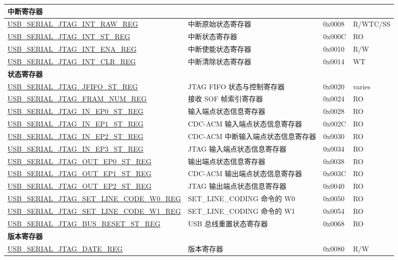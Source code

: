 \begin{longtable}{ | p{7.4cm} | p{5.2cm} | p{1.2cm} | p{1.7cm} | }
\multicolumn{4}{|l|}{\textbf{中断寄存器}} \\ \hline
\hyperref[regdesc:USBSERIALJTAGINTRAWREG]{USB\_SERIAL\_JTAG\_INT\_RAW\_REG} & 中断原始状态寄存器 & 0x0008 & R/WTC/SS \\ \hline
\hyperref[regdesc:USBSERIALJTAGINTSTREG]{USB\_SERIAL\_JTAG\_INT\_ST\_REG} & 中断状态寄存器 & 0x000C & RO \\ \hline
\hyperref[regdesc:USBSERIALJTAGINTENAREG]{USB\_SERIAL\_JTAG\_INT\_ENA\_REG} & 中断使能状态寄存器 & 0x0010 & R/W \\ \hline
\hyperref[regdesc:USBSERIALJTAGINTCLRREG]{USB\_SERIAL\_JTAG\_INT\_CLR\_REG} & 中断清除状态寄存器 & 0x0014 & WT \\ \hline
\multicolumn{4}{|l|}{\textbf{状态寄存器}} \\ \hline
\hyperref[regdesc:USBSERIALJTAGJFIFOSTREG]{USB\_SERIAL\_JTAG\_JFIFO\_ST\_REG} & JTAG FIFO 状态与控制寄存器 & 0x0020 & varies \\ \hline
\hyperref[regdesc:USBSERIALJTAGFRAMNUMREG]{USB\_SERIAL\_JTAG\_FRAM\_NUM\_REG} & 接收 SOF 帧索引寄存器 & 0x0024 & RO \\ \hline
\hyperref[regdesc:USBSERIALJTAGINEP0STREG]{USB\_SERIAL\_JTAG\_IN\_EP0\_ST\_REG} & 输入端点状态信息寄存器 & 0x0028 & RO \\ \hline
\hyperref[regdesc:USBSERIALJTAGINEP1STREG]{USB\_SERIAL\_JTAG\_IN\_EP1\_ST\_REG} & CDC-ACM 输入端点状态信息寄存器 & 0x002C & RO \\ \hline
\hyperref[regdesc:USBSERIALJTAGINEP2STREG]{USB\_SERIAL\_JTAG\_IN\_EP2\_ST\_REG} & CDC-ACM 中断输入端点状态信息寄存器 & 0x0030 & RO \\ \hline
\hyperref[regdesc:USBSERIALJTAGINEP3STREG]{USB\_SERIAL\_JTAG\_IN\_EP3\_ST\_REG} & JTAG 输入端点状态信息寄存器 & 0x0034 & RO \\ \hline
\hyperref[regdesc:USBSERIALJTAGOUTEP0STREG]{USB\_SERIAL\_JTAG\_OUT\_EP0\_ST\_REG} & 输出端点状态信息寄存器 & 0x0038 & RO \\ \hline
\hyperref[regdesc:USBSERIALJTAGOUTEP1STREG]{USB\_SERIAL\_JTAG\_OUT\_EP1\_ST\_REG} & CDC-ACM 输出端点状态信息寄存器 & 0x003C & RO \\ \hline
\hyperref[regdesc:USBSERIALJTAGOUTEP2STREG]{USB\_SERIAL\_JTAG\_OUT\_EP2\_ST\_REG} & JTAG 输出端点状态信息寄存器 & 0x0040 & RO \\ \hline
\hyperref[regdesc:USBSERIALJTAGSETLINECODEW0REG]{USB\_SERIAL\_JTAG\_SET\_LINE\_CODE\_W0\_REG} & SET\_LINE\_CODING 命令的 W0 & 0x0050 & RO \\ \hline
\hyperref[regdesc:USBSERIALJTAGSETLINECODEW1REG]{USB\_SERIAL\_JTAG\_SET\_LINE\_CODE\_W1\_REG} & SET\_LINE\_CODING 命令的 W1 & 0x0054 & RO \\ \hline
\hyperref[regdesc:USBSERIALJTAGBUSRESETSTREG]{USB\_SERIAL\_JTAG\_BUS\_RESET\_ST\_REG} & USB 总线重置状态寄存器 & 0x0068 & RO \\ \hline
\multicolumn{4}{|l|}{\textbf{版本寄存器}} \\ \hline
\hyperref[regdesc:USBSERIALJTAGDATEREG]{USB\_SERIAL\_JTAG\_DATE\_REG} & 版本寄存器 & 0x0080 & R/W \\ \hline
\end{longtable}
